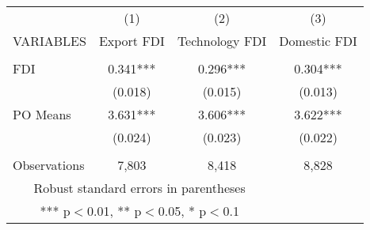 \documentclass[]{article}
\begin{document}
\begin{tabular}{lccc} \hline
 & (1) & (2) & (3) \\
VARIABLES &Export FDI&Technology FDI&Domestic FDI\\ \hline
 &  &  &    \\
FDI & 0.341*** & 0.296***  &0.304***   \\
 & (0.018) & (0.015) & (0.013)   \\
PO Means &  3.631***& 3.606*** & 3.622***   \\
 &  (0.024)& (0.023) & (0.022)  \\
 &  &  &    \\
 Observations & 7,803 &  8,418& 8,828 \\ \hline
\multicolumn{3}{c}{ Robust standard errors in parentheses} \\
\multicolumn{3}{c}{ *** p$<$0.01, ** p$<$0.05, * p$<$0.1} \\
\end{tabular}
\end{document}
